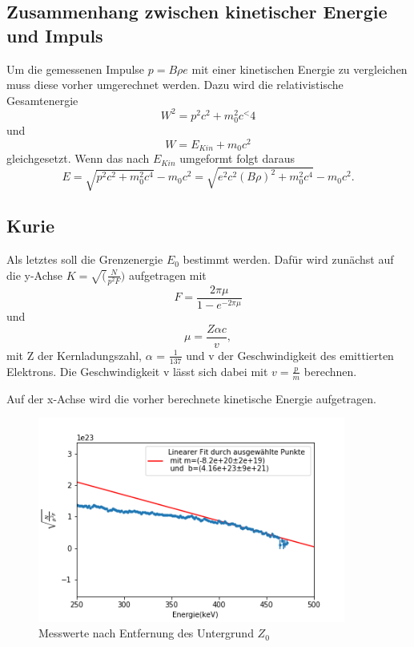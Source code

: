 \subsection{Zusammenhang zwischen kinetischer Energie und Impuls}
Um die gemessenen Impulse $p = B \rho e$ mit einer kinetischen Energie zu vergleichen muss diese vorher umgerechnet werden. Dazu wird die relativistische Gesamtenergie
\begin{equation}
	W^{2} = p^{2}c^{2} + m_{0}^{2} c^<{4}
\end{equation} 
und 
\begin{equation}
	W = E_{Kin} + m_{0}c^{2}
\end{equation}	
gleichgesetzt. Wenn das nach $E_{Kin}$ umgeformt folgt daraus
\begin{equation}
	E = \sqrt{p^{2}c^{2}+m_{0}^{2}c^{4}}-m_{0}c^{2} = \sqrt{e^{2}c^{2}(B \rho)^{2}+m_{0}^{2}c^{4}}-m_{0}c^{2}.
	\label{Ekin}
\end{equation}

	
	
\subsection{Kurie}
Als letztes soll die Grenzenergie $E_{0}$ bestimmt werden. Dafür wird zunächst auf die y-Achse $ K = \sqrt(\frac{N}{p^{2}F})$ aufgetragen mit
\begin{equation}
	F = \frac{2 \pi \mu}{1-e^{-2 \pi \mu}}
\end{equation}
und 
\begin{equation}
	\mu = \frac{Z \alpha c}{v},
\end{equation} 
mit Z der Kernladungszahl, $\alpha$ = $\frac{1}{137}$ und v der Geschwindigkeit des emittierten Elektrons. Die Geschwindigkeit v lässt sich dabei mit $v = \frac{p}{m}$ berechnen.

Auf der x-Achse wird die vorher berechnete kinetische Energie aufgetragen.

\begin{figure}[h]
	\centering
	\includegraphics[width=0.9\textwidth]{../Messdaten/Kurie.png}
	\caption{Messwerte nach Entfernung des Untergrund $Z_{0}$}
	\label{Kurie}
\end{figure}

